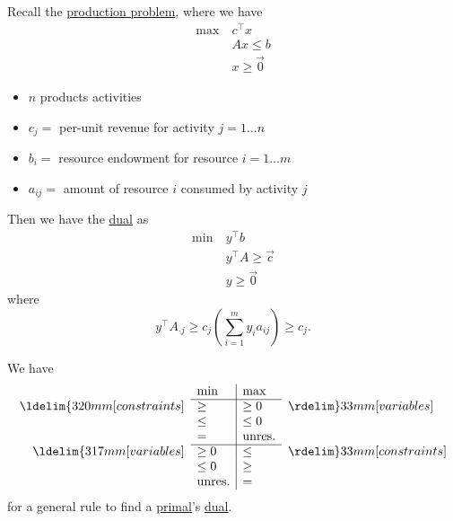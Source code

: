 \begin{prev}
	Recall the \hyperref[subsec:production-problem]{production problem}, where we have
	\[
		\begin{aligned}
			\max~ & c^{\top}x     \\
			      & Ax \leq b     \\
			      & x\geq \vec{0}
		\end{aligned}
	\]
	\begin{itemize}
		\item \(n\) products activities
		\item \(c_{j}=\) per-unit revenue for activity \(j = 1\ldots n\)
		\item \(b_{i}=\) resource endowment for resource \(i = 1\ldots m\)
		\item \(a_{ij}=\) amount of resource \(i\) consumed by activity \(j\)
	\end{itemize}
	Then we have the \hyperref[def:dual]{dual} as
	\[
		\begin{aligned}
			\min~ & y^{\top}b               \\
			      & y^{\top} A\geq  \vec{c} \\
			      & y\geq \vec{0}
		\end{aligned}
	\]
	where \[
		y^{\top}A_{\cdot j}\geq c_{j} \left( \sum\limits_{i=1}^{m} y_{i}a_{ij} \right) \geq c_{j}.
	\]
\end{prev}

\begin{note}
	We have
	\[
		\begin{array}{rl|ll}

			                                & \min          & \max          &                                \\
			\cline{2-3}
			\ldelim\{{3}{20mm}[constraints] & \geq          & \geq 0        & \rdelim\}{3}{3mm}[variables]   \\
			                                & \leq          & \leq 0        &                                \\
			                                & =             & \mbox{unres.} &                                \\
			\cline{2-3}
			\ldelim\{{3}{17mm}[variables]   & \geq 0        & \leq          & \rdelim\}{3}{3mm}[constraints] \\
			                                & \leq 0        & \geq          &                                \\
			                                & \mbox{unres.} & =             &                                \\
		\end{array}
	\]
	for a general rule to find a \hyperref[def:primal]{primal}'s \hyperref[def:dual]{dual}.
\end{note}

